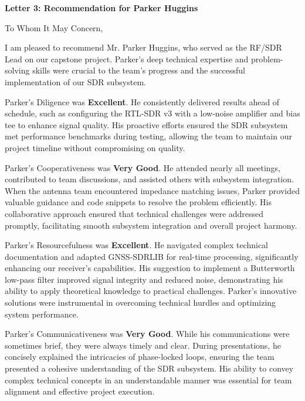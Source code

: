 \documentclass[11pt]{article}
\begin{document}
\begin{flushleft}
\textbf{Letter 3: Recommendation for Parker Huggins}

\vspace{12pt}

To Whom It May Concern,

\vspace{12pt}

I am pleased to recommend Mr. Parker Huggins, who served as the RF/SDR Lead on our capstone project. Parker’s deep technical expertise and problem-solving skills were crucial to the team’s progress and the successful implementation of our SDR subsystem.

Parker’s Diligence was \textbf{Excellent}. He consistently delivered results ahead of schedule, such as configuring the RTL-SDR v3 with a low-noise amplifier and bias tee to enhance signal quality. His proactive efforts ensured the SDR subsystem met performance benchmarks during testing, allowing the team to maintain our project timeline without compromising on quality.

Parker’s Cooperativeness was \textbf{Very Good}. He attended nearly all meetings, contributed to team discussions, and assisted others with subsystem integration. When the antenna team encountered impedance matching issues, Parker provided valuable guidance and code snippets to resolve the problem efficiently. His collaborative approach ensured that technical challenges were addressed promptly, facilitating smooth subsystem integration and overall project harmony.

Parker’s Resourcefulness was \textbf{Excellent}. He navigated complex technical documentation and adapted GNSS-SDRLIB for real-time processing, significantly enhancing our receiver’s capabilities. His suggestion to implement a Butterworth low-pass filter improved signal integrity and reduced noise, demonstrating his ability to apply theoretical knowledge to practical challenges. Parker’s innovative solutions were instrumental in overcoming technical hurdles and optimizing system performance.

Parker’s Communicativeness was \textbf{Very Good}. While his communications were sometimes brief, they were always timely and clear. During presentations, he concisely explained the intricacies of phase-locked loops, ensuring the team presented a cohesive understanding of the SDR subsystem. His ability to convey complex technical concepts in an understandable manner was essential for team alignment and effective project execution.


\end{flushleft}
\end{document}
